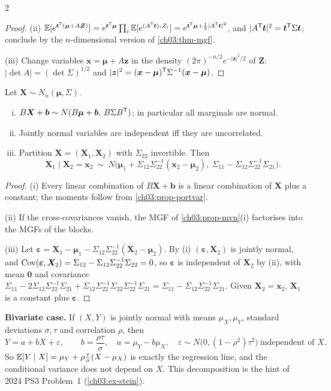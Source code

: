 \begin{paracol}{2}
\begin{proof}
(ii) $\mathbb{E}[e^{\bm t^{\mathsf T}(\bm\mu+A\bm Z)}]=e^{\bm t^{\mathsf T}\bm\mu}\prod_i\mathbb{E}[e^{(A^{\mathsf T}\bm t)_iZ_i}]
=e^{\bm t^{\mathsf T}\bm\mu+\frac12|A^{\mathsf T}\bm t|^2}$, and $|A^{\mathsf T}\bm t|^2=\bm t^{\mathsf T}\Sigma\bm t$; conclude by the $n$-dimensional version of
\cref{ch03:thm-mgf}.

(iii) Change variables $\bm x=\bm\mu+A\bm z$ in the density $(2\pi)^{-n/2}e^{-|\bm z|^2/2}$ of $\bm Z$:
$|\det A|=(\det\Sigma)^{1/2}$ and $|\bm z|^2=(\bm x-\bm\mu)^{\mathsf T}\Sigma^{-1}(\bm x-\bm\mu)$.
\end{proof}

\begin{theorem}\label{ch03:thm-mvn}
Let $\bm X\sim N_n(\bm\mu,\Sigma)$.
\begin{enumerate}[(i)]
  \item $B\bm X+\bm b\sim N(B\bm\mu+\bm b,\,B\Sigma B^{\mathsf T})$; in particular all marginals are normal.
  \item Jointly normal variables are independent iff they are uncorrelated.
  \item Partition $\bm X=(\bm X_1,\bm X_2)$ with $\Sigma_{22}$ invertible. Then
        \[
          \bm X_1\mid\bm X_2=\bm x_2\ \sim\ N\bigl(\bm\mu_1+\Sigma_{12}\Sigma_{22}^{-1}(\bm x_2-\bm\mu_2),\ \Sigma_{11}-\Sigma_{12}\Sigma_{22}^{-1}\Sigma_{21}\bigr).
        \]
\end{enumerate}
\end{theorem}
\begin{proof}
(i) Every linear combination of $B\bm X+\bm b$ is a linear combination of $\bm X$ plus a constant; the moments follow from
\cref{ch03:prop-portvar}.

(ii) If the cross-covariances vanish, the MGF of \cref{ch03:prop-mvn}(i) factorises into the MGFs
of the blocks.

(iii) Let $\bm\varepsilon=\bm X_1-\bm\mu_1-\Sigma_{12}\Sigma_{22}^{-1}(\bm X_2-\bm\mu_2)$. By (i) $(\bm\varepsilon,\bm X_2)$ is
jointly normal, and $\operatorname{Cov}(\bm\varepsilon,\bm X_2)=\Sigma_{12}-\Sigma_{12}\Sigma_{22}^{-1}\Sigma_{22}=0$, so $\bm\varepsilon$ is independent of
$\bm X_2$ by (ii), with mean $\bm0$ and covariance $\Sigma_{11}-2\Sigma_{12}\Sigma_{22}^{-1}\Sigma_{21}+\Sigma_{12}\Sigma_{22}^{-1}\Sigma_{22}\Sigma_{22}^{-1}\Sigma_{21}
=\Sigma_{11}-\Sigma_{12}\Sigma_{22}^{-1}\Sigma_{21}$. Given $\bm X_2=\bm x_2$, $\bm X_1$ is a constant plus $\bm\varepsilon$.
\end{proof}

\noindent\textbf{Bivariate case.} If $(X,Y)$ is jointly normal with means $\mu_X,\mu_Y$, standard deviations
$\sigma,\tau$ and correlation $\rho$, then
\begin{equation}\label{ch03:eq-bivreg}
  Y=a+bX+\varepsilon,\qquad b=\frac{\rho\tau}{\sigma},\quad a=\mu_Y-b\mu_X,\quad \varepsilon\sim N\bigl(0,(1-\rho^2)\tau^2\bigr)\ \text{independent of }X .
\end{equation}
So $\mathbb{E}[Y\mid X]=\mu_Y+\rho\frac{\tau}{\sigma}(X-\mu_X)$ is exactly the regression line, and the conditional variance does
not depend on $X$. This decomposition is the hint of 2024 PS3 Problem~1 (\cref{ch03:ex-stein}).


\end{paracol}
